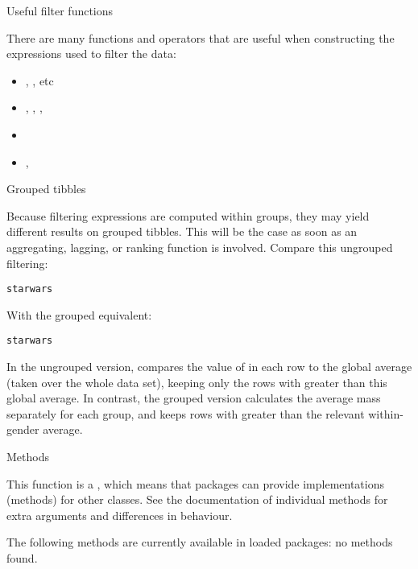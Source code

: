 \documentclass[a4paper]{book}
\begin{document}
%
\begin{Section}{Useful filter functions}


There are many functions and operators that are useful when constructing the
expressions used to filter the data:
\begin{itemize}

\item{} \code{\LinkA{==}{==}}, \code{\LinkA{>}{>}}, \code{\LinkA{>=}{>=}} etc
\item{} , \code{\LinkA{|}{|}}, \code{\LinkA{!}{!}}, 
\item{} 
\item{} , 

\end{itemize}

\end{Section}
%
\begin{Section}{Grouped tibbles}


Because filtering expressions are computed within groups, they may
yield different results on grouped tibbles. This will be the case
as soon as an aggregating, lagging, or ranking function is
involved. Compare this ungrouped filtering:

\begin{alltt}starwars %>% filter(mass > mean(mass, na.rm = TRUE))
\end{alltt}


With the grouped equivalent:

\begin{alltt}starwars %>% group_by(gender) %>% filter(mass > mean(mass, na.rm = TRUE))
\end{alltt}


In the ungrouped version,  compares the value of  in each row to
the global average (taken over the whole data set), keeping only the rows with
 greater than this global average. In contrast, the grouped version calculates
the average mass separately for each  group, and keeps rows with  greater
than the relevant within-gender average.
\end{Section}
%
\begin{Section}{Methods}

This function is a , which means that packages can provide
implementations (methods) for other classes. See the documentation of
individual methods for extra arguments and differences in behaviour.

The following methods are currently available in loaded packages:
no methods found.
\end{Section}
\end{document}
